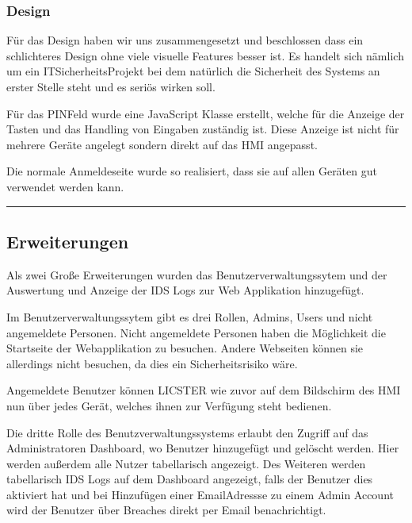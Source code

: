 \documentclass[letterpaper,10pt,ngerman]{sphinxmanual}
\begin{document}
\subsubsection{Design}
\label{\detokenize{webapp:design}}
Für das Design haben wir uns zusammengesetzt und beschlossen dass ein schlichteres Design ohne viele visuelle Features besser ist. Es handelt sich nämlich um ein IT\sphinxhyphen{}Sicherheits\sphinxhyphen{}Projekt bei dem natürlich die Sicherheit des Systems an erster Stelle steht und es seriös wirken soll.


Für das PIN\sphinxhyphen{}Feld wurde eine JavaScript Klasse erstellt, welche für die Anzeige der Tasten und das Handling von Eingaben zuständig ist. Diese Anzeige ist nicht für mehrere Geräte angelegt sondern direkt auf das HMI angepasst.


Die normale Anmeldeseite wurde so realisiert, dass sie auf allen Geräten gut verwendet werden kann.


\bigskip\hrule\bigskip



\subsection{Erweiterungen}
\label{\detokenize{webapp:erweiterungen}}
Als zwei Große Erweiterungen wurden das Benutzerverwaltungssytem und der Auswertung und Anzeige der IDS Logs zur Web Applikation hinzugefügt.

Im Benutzerverwaltungssytem gibt es drei Rollen, Admins, Users und nicht angemeldete Personen. Nicht angemeldete Personen haben die Möglichkeit die Startseite der Webapplikation zu besuchen. Andere Webseiten können sie allerdings nicht besuchen, da dies ein Sicherheitsrisiko wäre.

Angemeldete Benutzer können LICSTER wie zuvor auf dem Bildschirm des HMI nun über jedes Gerät, welches ihnen zur Verfügung steht bedienen.

Die dritte Rolle des Benutzverwaltungssystems erlaubt den Zugriff auf das Administratoren Dashboard, wo Benutzer hinzugefügt und gelöscht werden. Hier werden außerdem alle Nutzer tabellarisch angezeigt. Des Weiteren werden tabellarisch IDS Logs auf dem Dashboard angezeigt, falls der Benutzer dies aktiviert hat und bei Hinzufügen einer Email\sphinxhyphen{}Adressse zu einem Admin Account wird der Benutzer über Breaches direkt per Email benachrichtigt.
\end{document}
